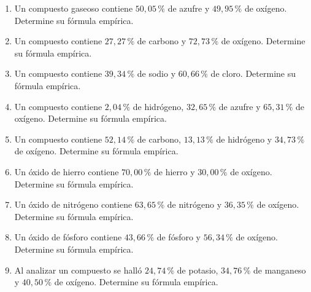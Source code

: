 \documentclass[12pt, letterpaper]{article}
\newcommand{\pc}{\text{\%}}
\begin{document}
\begin{enumerate}[leftmargin=*, start=30]

  \item \medio{}\hspace{0.55em}Un compuesto gaseoso contiene $50{,}05\,\pc$ de azufre y $49{,}95\,\pc$ de oxígeno. Determine su fórmula empírica.

  \item \medio{}\hspace{0.55em}Un compuesto contiene $27{,}27\,\pc$ de carbono y $72{,}73\,\pc$ de oxígeno. Determine su fórmula empírica.

  \item \medio{}\hspace{0.55em}Un compuesto contiene $39{,}34\,\pc$ de sodio y $60{,}66\,\pc$ de cloro. Determine su fórmula empírica.

  \item \medio{}\hspace{0.55em}Un compuesto contiene $2{,}04\,\pc$ de hidrógeno, $32{,}65\,\pc$ de azufre y $65{,}31\,\pc$ de oxígeno. Determine su fórmula empírica.

  \item \medio{}\hspace{0.55em}Un compuesto contiene $52{,}14\,\pc$ de carbono, $13{,}13\,\pc$ de hidrógeno y $34{,}73\,\pc$ de oxígeno. Determine su fórmula empírica.

  \item \medio{}\hspace{0.55em}Un óxido de hierro contiene $70{,}00\,\pc$ de hierro y $30{,}00\,\pc$ de oxígeno. Determine su fórmula empírica.

  \item \dificil{}\hspace{0.55em}Un óxido de nitrógeno contiene $63{,}65\,\pc$ de nitrógeno y $36{,}35\,\pc$ de oxígeno. Determine su fórmula empírica.

  \item \dificil{}\hspace{0.55em}Un óxido de fósforo contiene $43{,}66\,\pc$ de fósforo y $56{,}34\,\pc$ de oxígeno. Determine su fórmula empírica.

  \item \dificil{}\hspace{0.55em}Al analizar un compuesto se halló $24{,}74\,\pc$ de potasio, $34{,}76\,\pc$ de manganeso y $40{,}50\,\pc$ de oxígeno. Determine su fórmula empírica.


\end{enumerate}
\end{document}
